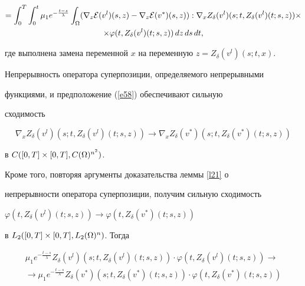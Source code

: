 \begin{pf}
\begin{gather*}
%


=\intl 0 T \intl 0 t \mu_1 e^{-\frac{t-s}{\lambda}} \intl {\Om}{}


(\nabla_z \E(v^l)(s,z)-\nabla_z \E(v^*)(s,z)):


\nabla_x Z_{\delta}(v^l)(s;t,Z_{\delta}(v^l)(t;s,z))\times\\


%


\times \varphi(t,Z_{\delta}(v^l)(t;s,z))\,dz\,ds\,dt, 


\end{gather*}


где выполнена замена переменной $x$ на переменную $z=Z_{\delta}(v^l)(s;t,x)$.





Непрерывность оператора суперпозиции, определяемого непрерывными


функциями, и предположение (\ref{e58}) обеспечивают сильную


сходимость


$$


\nabla_x Z_{\delta}(v^l)(s;t,Z_{\delta}(v^l)(t;s,z)) \to \nabla_x


Z_{\delta}(v^*)(s;t,Z_{\delta}(v^*)(t;s,z))


$$


в $C([0,T] \times [0,T], C(\Omega)^{n^2})$.





Кроме того, повторяя аргументы доказательства леммы \ref{l21} о


непрерывности оператора суперпозиции, получим сильную сходимость


$\varphi(t,Z_{\delta}(v^l)(t;s,z)) \to


\varphi(t,Z_{\delta}(v^*)(t;s,z))$


в $L_2([0,T] \times [0,T], L_2(\Omega)^n)$. Тогда


\begin{multline*}


\mu_1e^{-\frac{t-s}{\lambda}}Z_{\delta}(v^l)(s;t,Z_{\delta}(v^l)(t;s,z))


\cdot\varphi(t,Z_{\delta}(v^l)(t;s,z)) \to \\ \to


\mu_1e^{-\frac{t-s}{\lambda}}Z_{\delta}(v^*)(s;t,Z_{\delta}(v^*)(t;s,z))


\cdot \varphi(t,Z_{\delta}(v^*)(t;s,z))


\end{multline*}



\end{pf}
